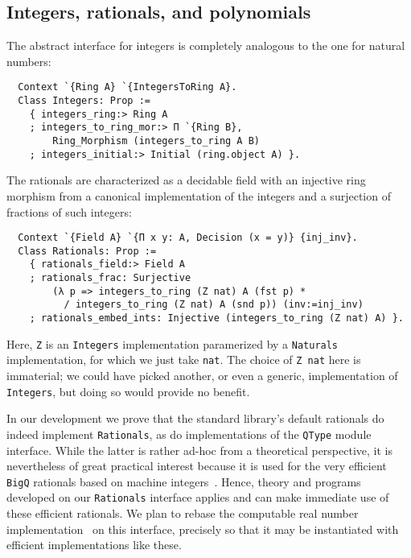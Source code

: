 \documentclass[a4paper,10pt,runningheads]{llncs}
\begin{document}
\subsection{Integers, rationals, and polynomials}

The abstract interface for integers is completely analogous to the one for natural numbers:
\begin{lstlisting}
  Context `{Ring A} `{IntegersToRing A}.
  Class Integers: Prop :=
    { integers_ring:> Ring A
    ; integers_to_ring_mor:> Π `{Ring B},
        Ring_Morphism (integers_to_ring A B)
    ; integers_initial:> Initial (ring.object A) }.
\end{lstlisting}

The rationals are characterized as a decidable field with an injective ring morphism from a canonical implementation of the integers and a surjection of fractions of such integers:
\begin{lstlisting}
  Context `{Field A} `{Π x y: A, Decision (x = y)} {inj_inv}.
  Class Rationals: Prop :=
    { rationals_field:> Field A
    ; rationals_frac: Surjective
        (λ p => integers_to_ring (Z nat) A (fst p) *
          / integers_to_ring (Z nat) A (snd p)) (inv:=inj_inv)
    ; rationals_embed_ints: Injective (integers_to_ring (Z nat) A) }.
\end{lstlisting}
Here, \lstinline|Z| is an \lstinline|Integers| implementation paramerized by a \lstinline|Naturals| implementation, for which we just take \lstinline|nat|. The choice of \lstinline|Z nat| here is immaterial; we could have picked another, or even a generic, implementation of \lstinline|Integers|, but doing so would provide no benefit.


In our development we prove that the standard library's default rationals do indeed implement \lstinline|Rationals|, as do implementations of the \lstinline|QType| module interface. While the latter is rather ad-hoc from a theoretical perspective, it is nevertheless of great practical interest because it is used for the very efficient \lstinline|BigQ| rationals based on machine integers~\cite{machineintegers}. Hence, theory and programs developed on our \lstinline|Rationals| interface applies and can make immediate use of these efficient rationals. We plan to rebase the computable real number implementation~\cite{Oconnor:real} on this interface, precisely so that it may be instantiated with efficient implementations like these.
\end{document}
